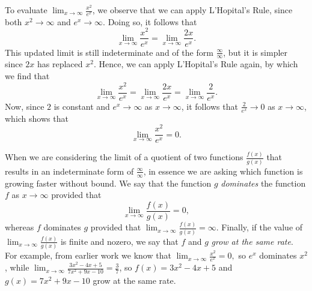 \vspace*{5pt}
\nin {}
\vspace*{1pt}

To evaluate $\lim_{x \to \infty} \frac{x^2}{e^x}$, we observe that we can apply L'Hopital's Rule, since both $x^2 \to \infty$ and $e^x \to \infty$.  Doing so, it follows that
$$\lim_{x \to \infty} \frac{x^2}{e^x} = \lim_{x \to \infty} \frac{2x}{e^x}.$$
This updated limit is still indeterminate and of the form $\frac{\infty}{\infty}$, but it is simpler since $2x$ has replaced $x^2$.  Hence, we can apply L'Hopital's Rule again, by which we find that
$$\lim_{x \to \infty} \frac{x^2}{e^x} = \lim_{x \to \infty} \frac{2x}{e^x} = \lim_{x \to \infty} \frac{2}{e^x}.$$
Now, since $2$ is constant and $e^x \to \infty$ as $x \to \infty$, it follows that $\frac{2}{e^x} \to 0$ as $x \to \infty$, which shows that
$$\lim_{x \to \infty} \frac{x^2}{e^x} = 0.$$



When we are considering the limit of a quotient of two functions $\frac{f(x)}{g(x)}$ that results in an indeterminate form of $\frac{\infty}{\infty}$, in essence we are asking which function is growing faster without bound.  We say that the function $g$ \emph{dominates} the function $f$ as $x \to \infty$ provided that 
$$\lim_{x \to \infty} \frac{f(x)}{g(x)} = 0,$$
whereas $f$ dominates $g$ provided that $\lim_{x \to \infty} \frac{f(x)}{g(x)} = \infty$.  Finally, if the value of $\lim_{x \to \infty} \frac{f(x)}{g(x)}$ is finite and nozero, we say that $f$ and $g$ \emph{grow at the same rate}.  For example, from earlier work we know that $\lim_{x \to \infty} \frac{x^2}{e^x} = 0,$ so $e^x$ dominates $x^2$, while $\lim_{x \to \infty} \frac{3x^2 - 4x + 5}{7x^2 + 9x - 10} = \frac{3}{7}$, so $f(x) = 3x^2 - 4x + 5$ and $g(x) = 7x^2 + 9x - 10$ grow at the same rate.

